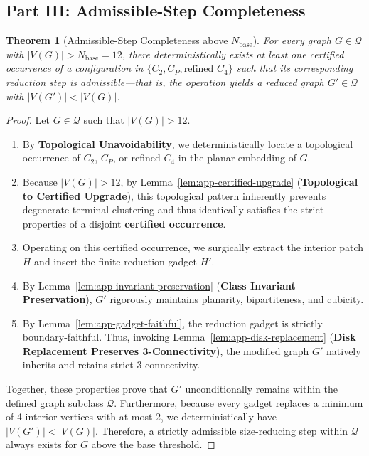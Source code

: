 \documentclass[12pt]{article}
\newtheorem{theorem}{Theorem}[section]
\begin{document}
\subsection*{Part III: Admissible-Step Completeness}

\begin{theorem}[Admissible-Step Completeness above $N_{\mathrm{base}}$]
\label{thm:app-admissible-completeness}
For every graph $G \in \mathcal{Q}$ with $|V(G)| > N_{\mathrm{base}} = 12$, there deterministically exists at least one certified occurrence of a configuration in $\{C_2, C_P, \text{refined } C_4\}$ such that its corresponding reduction step is admissible—that is, the operation yields a reduced graph $G' \in \mathcal{Q}$ with $|V(G')| < |V(G)|$.
\end{theorem}
\begin{proof}
Let $G \in \mathcal{Q}$ such that $|V(G)| > 12$. 
\begin{enumerate}
    \item By \textbf{Topological Unavoidability}, we deterministically locate a topological occurrence of $C_2$, $C_P$, or refined $C_4$ in the planar embedding of $G$.
    \item Because $|V(G)| > 12$, by Lemma~\ref{lem:app-certified-upgrade} (\textbf{Topological to Certified Upgrade}), this topological pattern inherently prevents degenerate terminal clustering and thus identically satisfies the strict properties of a disjoint \textbf{certified occurrence}.
    \item Operating on this certified occurrence, we surgically extract the interior patch $H$ and insert the finite reduction gadget $H'$.
    \item By Lemma~\ref{lem:app-invariant-preservation} (\textbf{Class Invariant Preservation}), $G'$ rigorously maintains planarity, bipartiteness, and cubicity.
    \item By Lemma~\ref{lem:app-gadget-faithful}, the reduction gadget is strictly boundary-faithful. Thus, invoking Lemma~\ref{lem:app-disk-replacement} (\textbf{Disk Replacement Preserves 3-Connectivity}), the modified graph $G'$ natively inherits and retains strict 3-connectivity.
\end{enumerate}
Together, these properties prove that $G'$ unconditionally remains within the defined graph subclass $\mathcal{Q}$. Furthermore, because every gadget replaces a minimum of 4 interior vertices with at most 2, we deterministically have $|V(G')| < |V(G)|$. Therefore, a strictly admissible size-reducing step within $\mathcal{Q}$ always exists for $G$ above the base threshold.
\end{proof}
\end{document}
